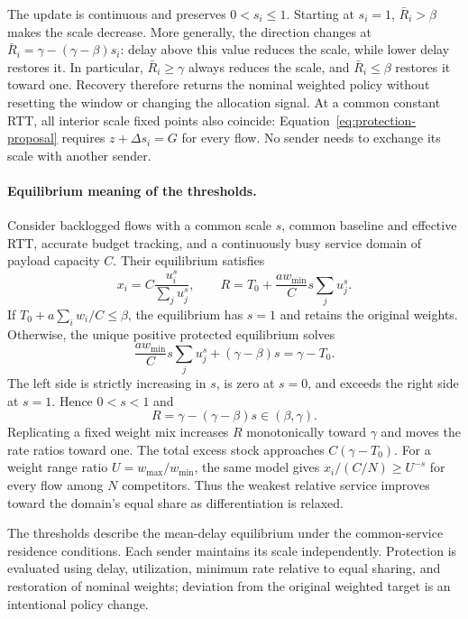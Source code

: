 The update is continuous and preserves $0<s_i\le1$. Starting at $s_i=1$,
$\bar R_i>\beta$ makes the scale decrease. More generally, the direction changes
at $\bar R_i=\gamma-(\gamma-\beta)s_i$: delay above this value reduces the
scale, while lower delay restores it. In particular, $\bar R_i\ge\gamma$
always reduces the scale, and $\bar R_i\le\beta$ restores it toward one.
Recovery therefore returns the nominal weighted policy without resetting the
window or changing the allocation signal. At a common constant RTT, all interior scale fixed points also coincide:
Equation~\eqref{eq:protection-proposal} requires $z+\Delta s_i=G$ for every
flow. No sender needs to exchange its scale with another sender.

\paragraph{Equilibrium meaning of the thresholds.}
Consider backlogged flows with a common scale $s$, common baseline and effective
RTT, accurate budget tracking, and a continuously busy service domain of payload
capacity $C$. Their equilibrium satisfies
\begin{equation}
 x_i=C\frac{u_i^s}{\sum_j u_j^s},\qquad
 R=T_0+\frac{a w_{\min}}{C}s\sum_j u_j^s.
 \label{eq:protection-equilibrium}
\end{equation}
If $T_0+a\sum_iw_i/C\le\beta$, the equilibrium has $s=1$ and retains the
original weights. Otherwise, the unique positive protected equilibrium solves
\begin{equation}
 \frac{a w_{\min}}{C}s\sum_j u_j^s+(\gamma-\beta)s
       =\gamma-T_0.
 \label{eq:protection-root}
\end{equation}
The left side is strictly increasing in $s$, is zero at $s=0$, and exceeds
the right side at $s=1$. Hence $0<s<1$ and
\begin{equation}
 R=\gamma-(\gamma-\beta)s\in(\beta,\gamma).
 \label{eq:protection-asymptote}
\end{equation}
Replicating a fixed weight mix increases $R$ monotonically toward $\gamma$
and moves the rate ratios toward one. The total excess stock approaches
$C(\gamma-T_0)$. For a weight range ratio
$U=w_{\max}/w_{\min}$, the same model gives
$x_i/(C/N)\ge U^{-s}$ for every flow among $N$ competitors.
Thus the weakest relative service improves toward the domain's equal share
as differentiation is relaxed.

The thresholds describe the mean-delay equilibrium under the common-service
residence conditions. Each sender maintains its scale independently. Protection is evaluated using delay, utilization,
minimum rate relative to equal sharing, and restoration of nominal weights;
deviation from the original weighted target is an intentional policy change.
